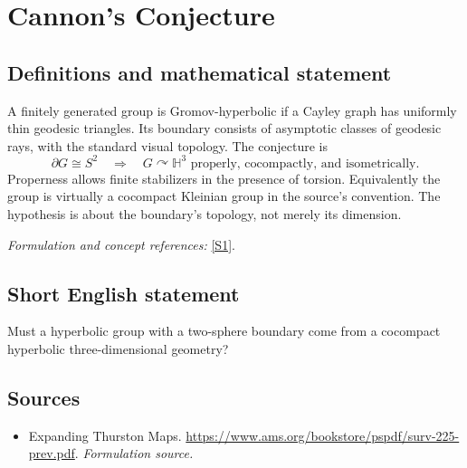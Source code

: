 \documentclass[11pt]{article}
\begin{document}
\section*{\texorpdfstring{Cannon's Conjecture}{Cannon's Conjecture}}\label{30000030}
\subsection{Definitions and mathematical statement}
A finitely generated group is Gromov-hyperbolic if a Cayley graph has uniformly thin geodesic triangles. Its boundary consists of asymptotic classes of geodesic rays, with the standard visual topology. The conjecture is
\[
 \partial G\cong S^2\quad\Longrightarrow\quad
 G\curvearrowright\mathbb H^3\text{ properly, cocompactly, and isometrically}.
\]
Properness allows finite stabilizers in the presence of torsion. Equivalently the group is virtually a cocompact Kleinian group in the source's convention. The hypothesis is about the boundary's topology, not merely its dimension.
\par\smallskip\textit{Formulation and concept references:} \href{https://www.ams.org/bookstore/pspdf/surv-225-prev.pdf}{[S1]}.

\subsection{Short English statement}
Must a hyperbolic group with a two-sphere boundary come from a cocompact hyperbolic three-dimensional geometry?
\subsection{Sources}
\begin{itemize}
\item[S1]Expanding Thurston Maps.
\url{https://www.ams.org/bookstore/pspdf/surv-225-prev.pdf}.
\textit{Formulation source.}
\end{itemize}
\end{document}
